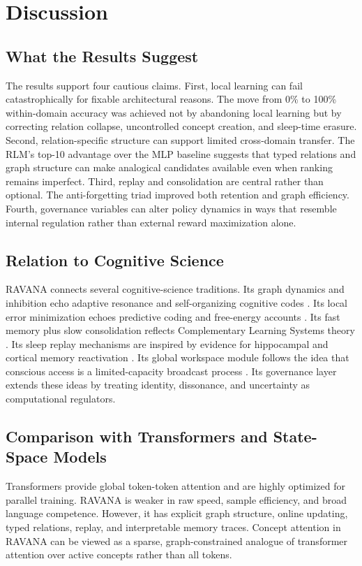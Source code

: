 \documentclass[11pt]{article}
\begin{document}
\section{Discussion}
\subsection{What the Results Suggest}
The results support four cautious claims. First, local learning can fail catastrophically for fixable architectural reasons. The move from 0\% to 100\% within-domain accuracy was achieved not by abandoning local learning but by correcting relation collapse, uncontrolled concept creation, and sleep-time erasure. Second, relation-specific structure can support limited cross-domain transfer. The RLM's top-10 advantage over the MLP baseline suggests that typed relations and graph structure can make analogical candidates available even when ranking remains imperfect. Third, replay and consolidation are central rather than optional. The anti-forgetting triad improved both retention and graph efficiency. Fourth, governance variables can alter policy dynamics in ways that resemble internal regulation rather than external reward maximization alone.

\subsection{Relation to Cognitive Science}
RAVANA connects several cognitive-science traditions. Its graph dynamics and inhibition echo adaptive resonance and self-organizing cognitive codes \cite{grossberg1980}. Its local error minimization echoes predictive coding and free-energy accounts \cite{friston2010}. Its fast memory plus slow consolidation reflects Complementary Learning Systems theory \cite{mcclelland1995,kumaran2016}. Its sleep replay mechanisms are inspired by evidence for hippocampal and cortical memory reactivation \cite{wilson1994,ji2007,diekelmann2010}. Its global workspace module follows the idea that conscious access is a limited-capacity broadcast process \cite{baars1997}. Its governance layer extends these ideas by treating identity, dissonance, and uncertainty as computational regulators.

\subsection{Comparison with Transformers and State-Space Models}
Transformers provide global token-token attention and are highly optimized for parallel training. RAVANA is weaker in raw speed, sample efficiency, and broad language competence. However, it has explicit graph structure, online updating, typed relations, replay, and interpretable memory traces. Concept attention in RAVANA can be viewed as a sparse, graph-constrained analogue of transformer attention over active concepts rather than all tokens.
\end{document}
